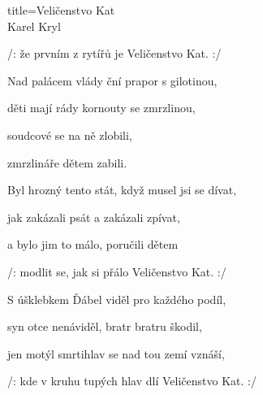 \begin{song}{title=\centering Veličenstvo Kat \\\normalsize Karel Kryl  \vspace*{-0.3cm}}
{\begin{minipage}[t]{0.55\textwidth}
   	/: že prvním z rytířů je Veličenstvo Kat. :/
   	
	Nad palácem vlády ční prapor s gilotinou,
 
 	děti mají rády kornouty se zmrzlinou,
  
  	soudcové se na ně zlobili,
   
   	zmrzlináře dětem zabili.


\end{minipage}\begin{minipage}[t]{0.55\textwidth}\setlength{\parindent}{0.45cm}\vspace*{0.55cm}  %

\sloka
	Byl hrozný tento stát, když musel jsi se dívat,
   
   	jak zakázali psát a zakázali zpívat,
   
   	a bylo jim to málo, poručili dětem
   
   	/: modlit se, jak si přálo Veličenstvo Kat. :/

\sloka
	S úšklebkem Ďábel viděl pro každého podíl,
  
  	syn otce nenáviděl, bratr bratru škodil,
   
   	jen motýl smrtihlav se nad tou zemí vznáší,
   
   	/: kde v kruhu tupých hlav dlí Veličenstvo Kat. :/


\end{minipage}
}
\setcounter{Slokočet}{0}
\end{song}

